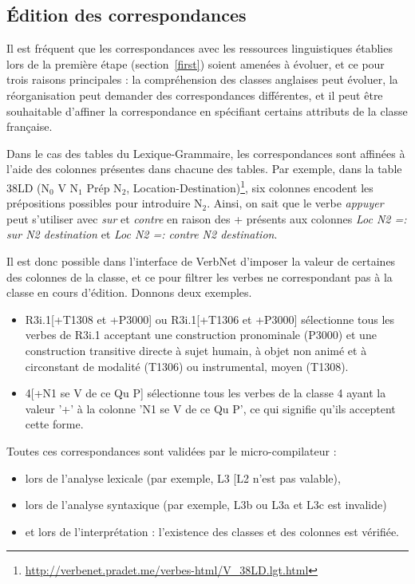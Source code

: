 \subsection{Édition des correspondances}

Il est fréquent que les correspondances avec les ressources linguistiques
établies lors de la première étape (section~\ref{first}) soient amenées à
évoluer, et ce pour trois raisons principales : la compréhension des classes
anglaises peut évoluer, la réorganisation peut demander des correspondances
différentes, et il peut être souhaitable d'affiner la correspondance en
spécifiant certains attributs de la classe française.

Dans le cas des tables du Lexique-Grammaire, les correspondances sont affinées
à l'aide des colonnes présentes dans chacune des tables. Par exemple, dans la
table 38LD (N$_0$ V N$_1$ Prép N$_2$,
Location-Destination)\footnote{\url{http://verbenet.pradet.me/verbes-html/V_38LD.lgt.html}},
six colonnes encodent les prépositions possibles pour introduire N$_2$.  Ainsi,
on sait que le verbe \emph{appuyer} peut s'utiliser avec \emph{sur} et
\emph{contre} en raison des + présents aux colonnes \emph{Loc N2 =: sur N2
destination} et \emph{Loc N2 =: contre N2 destination}.

Il est donc possible dans l'interface de VerbNet d'imposer la valeur de
certaines des colonnes de la classe, et ce pour filtrer les verbes ne
correspondant pas à la classe \verbenet{} en cours d'édition. Donnons deux
exemples.

\begin{itemize}
    \item R3i.1[+T1308 et +P3000] ou R3i.1[+T1306 et +P3000] sélectionne tous
        les verbes de R3i.1 acceptant une construction pronominale (P3000) et
        une construction transitive directe à sujet humain, à objet non animé
        et à circonstant de modalité (T1306) ou instrumental, moyen (T1308).
    \item 4[+N1 se V de ce Qu P] sélectionne tous les verbes de la classe 
        4 ayant la valeur '+' à la colonne 'N1 se V de ce Qu P', ce qui
        signifie qu'ils acceptent cette forme.
\end{itemize}

Toutes ces correspondances sont validées par le micro-compilateur :

\begin{itemize}
    \item lors de l'analyse lexicale (par exemple, L3 [L2 n'est pas valable),
    \item lors de l'analyse syntaxique (par exemple, L3b ou L3a et L3c est invalide)
    \item et lors de l'interprétation : l'existence des classes et des colonnes
        est vérifiée.
\end{itemize}

